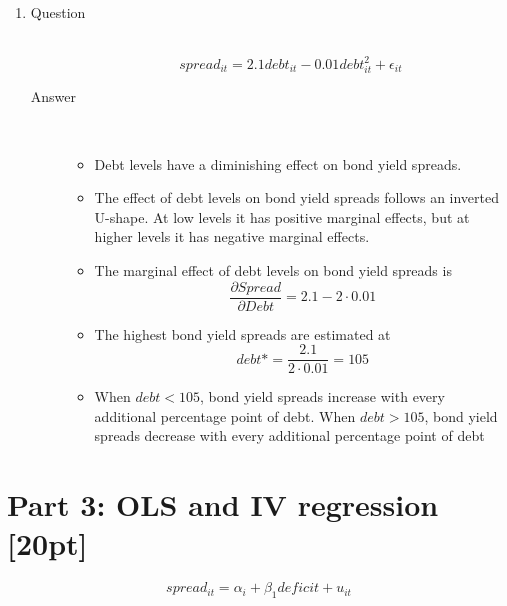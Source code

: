 \documentclass{article}
\begin{document}
\begin{enumerate}
  \item
  \begin{description}
    \item[Question] \hfill \\
    \[ spread_{it} = 2.1debt_{it} - 0.01debt_{it}^2 + \epsilon_{it} \]
    \item[Answer] \hfill \\
    \begin{itemize}
      \item Debt levels have a diminishing effect on bond yield spreads.
      \item The effect of debt levels on bond yield spreads follows an inverted U-shape. At low levels it has positive marginal effects, but at higher levels it has negative marginal effects.
      \item The marginal effect of debt levels on bond yield spreads is 
      \[ \frac{\partial Spread}{\partial Debt} = 2.1 - 2 \cdot 0.01 \]
      \item The  highest bond yield spreads are estimated at 
      \[ debt* = \frac{2.1}{2\cdot 0.01} = 105 \]
      \item When \(debt < 105\), bond yield spreads increase with every additional percentage point of debt. When \(debt > 105\), bond yield spreads decrease with every additional percentage point of debt
    \end{itemize}
  \end{description}
  
\end{enumerate}

\section{Part 3: OLS and IV regression [20pt]}

\[spread_{it} = \alpha_i + \beta_{1}deficit + u_{it} \]
\end{document}
